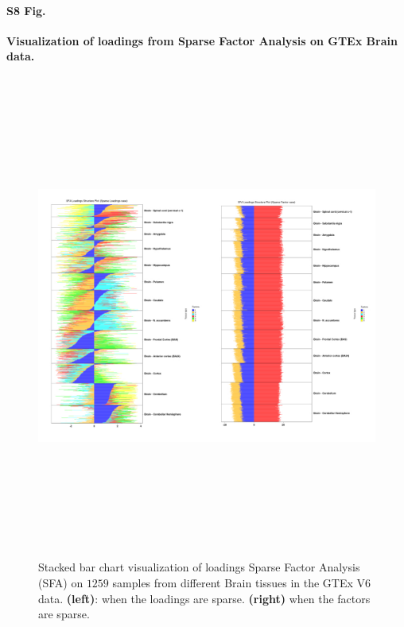 \documentclass[10pt,letterpaper]{article}
\begin{document}
\paragraph{S8 Fig.}

\label{figS8}
{\bf Visualization of loadings from Sparse Factor Analysis on GTEx Brain data.}
\begin{figure}[ht]
\centering
\includegraphics[height=6.3in, width=7in]{../../plots/gtex-figures/gtex_sfa_brain.jpeg}
 \caption{ Stacked bar chart visualization of loadings Sparse Factor Analysis (SFA) on $1259$ samples from different Brain tissues in the GTEx V6 data. \textbf{(left)}: when the loadings are sparse. \textbf{(right)} when the factors are sparse.}
\end{figure}
\end{document}
